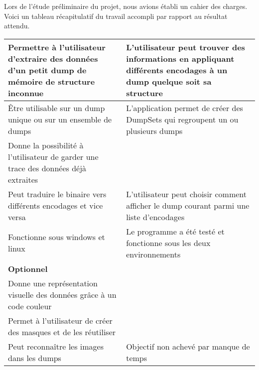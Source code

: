 Lors de l’étude préliminaire du projet, nous avions établi un cahier des charges. Voici un tableau récapitulatif du travail accompli par rapport au résultat attendu.


\begin{tabular}{|p{6cm}|p{6cm}|}
  \hline
  Permettre à l’utilisateur d’extraire des données d’un petit dump de mémoire de structure inconnue &
  L'utilisateur peut trouver des informations en appliquant différents encodages à un dump quelque soit sa structure
  \\ \hline
  Être utilisable sur un dump unique ou sur un ensemble de dumps &
  L'application permet de créer des DumpSets qui regroupent un ou plusieurs dumps
  \\ \hline
  Donne la possibilité à l’utilisateur de garder une trace des données déjà extraites &
  
  \\ \hline
  Peut traduire le binaire vers différents encodages et vice versa &
  L'utilisateur peut choisir comment afficher le dump courant parmi une liste d'encodages
  \\ \hline
  Fonctionne sous windows et linux &
  Le programme a été testé et fonctionne sous les deux environnements
  \\ \hline \hline
  \textbf{Optionnel} &
  \\ \hline
  Donne une représentation visuelle des données grâce à un code couleur &
  
  \\ \hline
  Permet à l’utilisateur de créer des masques et de les réutiliser &
  
  \\ \hline
  Peut reconnaître les images dans les dumps &
  Objectif non achevé par manque de temps
  \\ \hline
\end{tabular}
